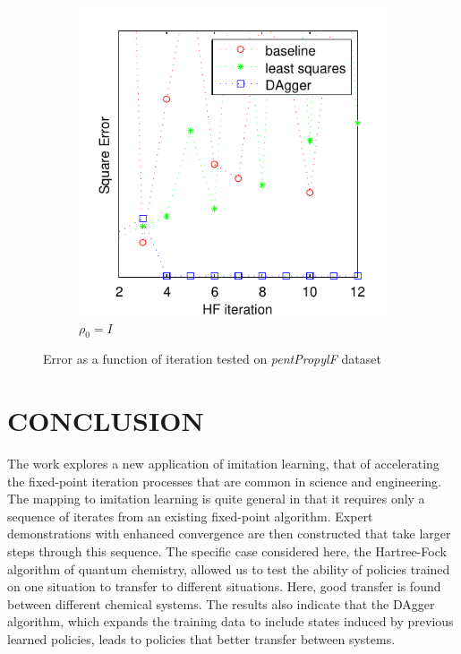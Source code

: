\documentclass[twoside,11pt]{article}
\begin{document}
\begin{figure}[h!]
\begin{subfigure}{.5\textwidth}
  \includegraphics[scale=0.7]{propylsub_peye_test_12iter.pdf}
  \caption{$\rho_0 = I$}
  \label{fig:propSubI}
\end{subfigure}
\caption{Error as a function of iteration tested on \textit{pentPropylF} dataset}
\label{fig:testpropSub}
\end{figure}


\section{CONCLUSION}

The work explores a new application of imitation learning, that of accelerating the fixed-point iteration processes that are common in science and engineering. The mapping to imitation learning is quite general in that it requires only a sequence of iterates from an existing fixed-point algorithm. Expert demonstrations with enhanced convergence are then constructed that take larger steps through this sequence. The specific case considered here, the Hartree-Fock algorithm of quantum chemistry, allowed us to test the ability of policies trained on one situation to transfer to different situations. Here, good transfer is found between different chemical systems. The results also indicate that the DAgger algorithm, which expands the training data to include states induced by previous learned policies, leads to policies that better transfer between systems.  


\end{document}
